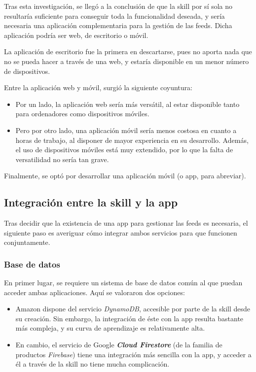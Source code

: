 \documentclass[11pt,spanish,listoffigures,listoftables,table,hyphens,dvipsnames]{tfgetsinf}
\begin{document}
Tras esta investigación, se llegó a la conclusión de que la skill por sí sola no resultaría suficiente para conseguir toda la funcionalidad deseada, y sería necesaria una aplicación complementaria para la gestión de las feeds. Dicha aplicación podría ser web, de escritorio o móvil.

La aplicación de escritorio fue la primera en descartarse, pues no aporta nada que no se pueda hacer a través de una web, y estaría disponible en un menor número de dispositivos.

Entre la aplicación web y móvil, surgió la siguiente coyuntura:

\begin{itemize}
   \item Por un lado, la aplicación web sería más versátil, al estar disponible tanto para ordenadores como dispositivos móviles.
   
   \item Pero por otro lado, una aplicación móvil sería menos costosa en cuanto a horas de trabajo, al disponer de mayor experiencia en su desarrollo. Además, el uso de dispositivos móviles está muy extendido, por lo que la falta de versatilidad no sería tan grave.
\end{itemize}

Finalmente, se optó por desarrollar una aplicación móvil (o app, para abreviar).

\subsection{Integración entre la skill y la app}

Tras decidir que la existencia de una app para gestionar las feeds es necesaria, el siguiente paso es averiguar cómo integrar ambos servicios para que funcionen conjuntamente.

\subsubsection{Base de datos}

En primer lugar, se requiere un sistema de base de datos común al que puedan acceder ambas aplicaciones. Aquí se valoraron dos opciones:

\begin{itemize}
   \item Amazon dispone del servicio \emph{DynamoDB}, accesible por parte de la skill desde su creación. Sin embargo, la integración de éste con la app resulta bastante más compleja, y su curva de aprendizaje es relativamente alta.
   \item En cambio, el servicio de Google \textbf{\emph{Cloud Firestore}} (de la familia de productos \emph{Firebase}) tiene una integración más sencilla con la app, y acceder a él a través de la skill no tiene mucha complicación.
\end{itemize}
\end{document}

